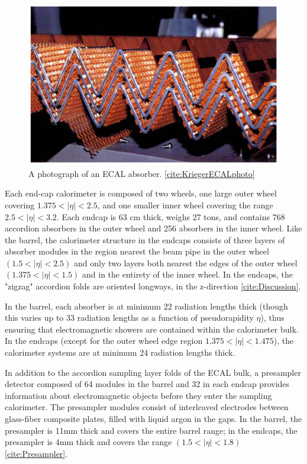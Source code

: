 \begin{figure}
  \includegraphics[width=\linewidth]{figures/detector_chapter/ECALphoto.png}
  \caption{A photograph of an ECAL absorber. \ref{cite:KriegerECALphoto}}
  \label{fig:ECALphoto}
\end{figure}

Each end-cap calorimeter is composed of two wheels, one large outer wheel covering $ 1.375<| \eta |<2.5 $, and one smaller inner wheel covering the range $ 2.5<| \eta |<3.2 $. Each endcap is 63 cm thick, weighs 27 tons, and contains 768 accordion absorbers in the outer wheel and 256 absorbers in the inner wheel. Like the barrel, the calorimeter structure in the endcaps consists of three layers of absorber modules in the region nearest the beam pipe in the outer wheel $( 1.5 < |\eta | <2.5 )$ and only two layers both nearest the edges of the outer wheel $(1.375 < |\eta | < 1.5)$ and in the entirety of the inner wheel. In the endcaps, the "zigzag" accordion folds are oriented longways, in the z-direction \ref{cite:Discussion}.

In the barrel, each absorber is at minimum 22 radiation lengths thick (though this varies up to 33 radiation lengths as a function of pseudorapidity $\eta$), thus ensuring that electromagnetic showers are contained within the calorimeter bulk. In the endcaps (except for the outer wheel edge region  $ 1.375< | \eta |< 1.475 $), the calorimeter systems are at minimum 24 radiation lengths thick.

In addition to the accordion sampling layer folds of the ECAL bulk, a presampler detector composed of 64 modules in the barrel and 32 in each endcap provides information about electromagnetic objects before they enter the sampling calorimeter. The presampler modules consist of interleaved electrodes between glass-fiber composite plates, filled with liquid argon in the gaps. In the barrel, the presampler is 11mm thick and covers the entire barrel range; in the endcaps, the presampler is 4mm thick and covers the range $(1.5<| \eta |<1.8)$ \ref{cite:Presampler}.

